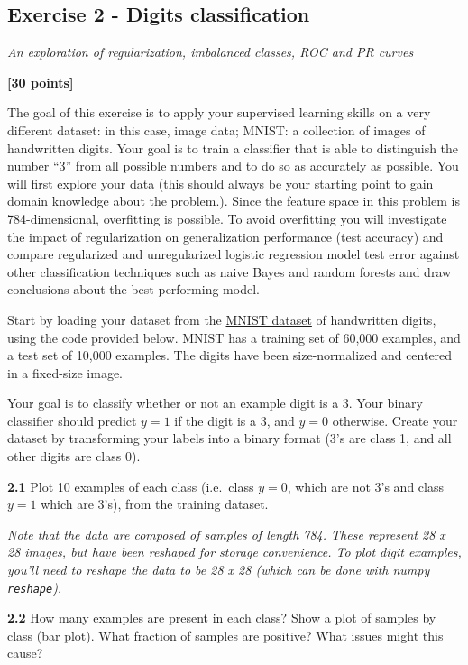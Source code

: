 \documentclass[
  letterpaper,
  DIV=11,
  numbers=noendperiod]{scrartcl}
\begin{document}
\subsection{Exercise 2 - Digits
classification}\label{exercise-2---digits-classification}

\emph{An exploration of regularization, imbalanced classes, ROC and PR
curves}

\textbf{{[}30 points{]}}

The goal of this exercise is to apply your supervised learning skills on
a very different dataset: in this case, image data; MNIST: a collection
of images of handwritten digits. Your goal is to train a classifier that
is able to distinguish the number ``3'' from all possible numbers and to
do so as accurately as possible. You will first explore your data (this
should always be your starting point to gain domain knowledge about the
problem.). Since the feature space in this problem is 784-dimensional,
overfitting is possible. To avoid overfitting you will investigate the
impact of regularization on generalization performance (test accuracy)
and compare regularized and unregularized logistic regression model test
error against other classification techniques such as naive Bayes and
random forests and draw conclusions about the best-performing model.

Start by loading your dataset from the
\href{http://yann.lecun.com/exdb/mnist/}{MNIST dataset} of handwritten
digits, using the code provided below. MNIST has a training set of
60,000 examples, and a test set of 10,000 examples. The digits have been
size-normalized and centered in a fixed-size image.

Your goal is to classify whether or not an example digit is a 3. Your
binary classifier should predict \(y=1\) if the digit is a 3, and
\(y=0\) otherwise. Create your dataset by transforming your labels into
a binary format (3's are class 1, and all other digits are class 0).

\textbf{2.1} Plot 10 examples of each class (i.e.~class \(y=0\), which
are not 3's and class \(y=1\) which are 3's), from the training dataset.

\emph{Note that the data are composed of samples of length 784. These
represent 28 x 28 images, but have been reshaped for storage
convenience. To plot digit examples, you'll need to reshape the data to
be 28 x 28 (which can be done with numpy \texttt{reshape}).}

\textbf{2.2} How many examples are present in each class? Show a plot of
samples by class (bar plot). What fraction of samples are positive? What
issues might this cause?
\end{document}
